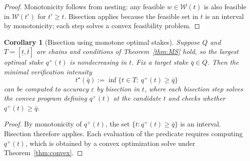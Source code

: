 \documentclass[final,3p,times]{elsarticle}
\theoremstyle{plain}
\newtheorem{corollary}{Corollary}
\theoremstyle{definition}
\newcommand{\1}{\mathbbm{1}}
\newcommand{\cW}{\mathcal{W}}
\begin{document}
\begin{proof}
Monotonicity follows from nesting: any feasible $w\in\cW(t)$ is also feasible in $\cW(t')$ for $t'\ge t$. Bisection applies because the feasible set in $t$ is an interval by monotonicity; each step solves a convex feasibility problem. 
\end{proof}

\begin{corollary}[Bisection using monotone optimal stakes]\label{cor:bisect}
Suppose $Q$ and $T=[\underline t,\overline t]$ are chains and conditions of Theorem~\ref{thm:MS} hold, so the largest optimal stake $q^{+}(t)$ is nondecreasing in $t$. Fix a target stake $\bar q\in Q$. Then the minimal verification intensity
\[
t^\star(\bar q):=\inf\{t\in T:\ q^{+}(t)\ge \bar q\}
\]
can be computed to accuracy $\varepsilon$ by bisection in $t$, where each bisection step solves the convex program defining $q^{+}(t)$ at the candidate $t$ and checks whether $q^{+}(t)\ge \bar q$.
\end{corollary}

\begin{proof}
By monotonicity of $q^{+}(t)$, the set $\{t: q^{+}(t)\ge \bar q\}$ is an interval. Bisection therefore applies. Each evaluation of the predicate requires computing $q^{+}(t)$, which is obtained by a convex optimization solve under Theorem~\ref{thm:convex}. 
\end{proof}


\end{document}
